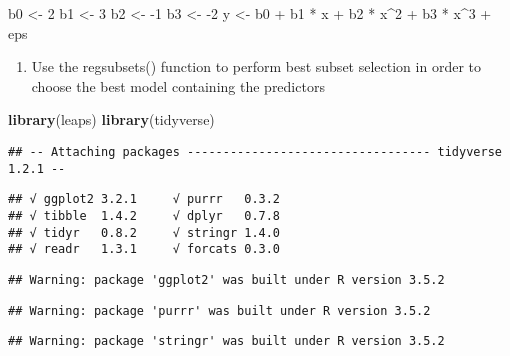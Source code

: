 \documentclass[]{article}
\newenvironment{Shaded}{\begin{snugshade}}{\end{snugshade}}
\newcommand{\KeywordTok}[1]{\textcolor[rgb]{0.13,0.29,0.53}{\textbf{{#1}}}}
\newcommand{\DecValTok}[1]{\textcolor[rgb]{0.00,0.00,0.81}{{#1}}}
\newcommand{\StringTok}[1]{\textcolor[rgb]{0.31,0.60,0.02}{{#1}}}
\newcommand{\NormalTok}[1]{{#1}}
\providecommand{\tightlist}{%
  \setlength{\itemsep}{0pt}\setlength{\parskip}{0pt}}
\begin{document}
\begin{Shaded}
\begin{Highlighting}[]
\NormalTok{b0 <-}\StringTok{ }\DecValTok{2}
\NormalTok{b1 <-}\StringTok{ }\DecValTok{3}
\NormalTok{b2 <-}\StringTok{ }\NormalTok{-}\DecValTok{1}
\NormalTok{b3 <-}\StringTok{ }\NormalTok{-}\DecValTok{2}
\NormalTok{y <-}\StringTok{ }\NormalTok{b0 +}\StringTok{ }\NormalTok{b1 *}\StringTok{ }\NormalTok{x +}\StringTok{ }\NormalTok{b2 *}\StringTok{ }\NormalTok{x^}\DecValTok{2} \NormalTok{+}\StringTok{ }\NormalTok{b3 *}\StringTok{ }\NormalTok{x^}\DecValTok{3} \NormalTok{+}\StringTok{ }\NormalTok{eps}
\end{Highlighting}
\end{Shaded}

\begin{enumerate}
\def\labelenumi{(\alph{enumi})}
\setcounter{enumi}{2}
\tightlist
\item
  Use the regsubsets() function to perform best subset selection in
  order to choose the best model containing the predictors
\end{enumerate}

\begin{Shaded}
\begin{Highlighting}[]
\KeywordTok{library}\NormalTok{(leaps)}
\KeywordTok{library}\NormalTok{(tidyverse)}
\end{Highlighting}
\end{Shaded}

\begin{verbatim}
## -- Attaching packages ---------------------------------- tidyverse 1.2.1 --
\end{verbatim}

\begin{verbatim}
## √ ggplot2 3.2.1     √ purrr   0.3.2
## √ tibble  1.4.2     √ dplyr   0.7.8
## √ tidyr   0.8.2     √ stringr 1.4.0
## √ readr   1.3.1     √ forcats 0.3.0
\end{verbatim}

\begin{verbatim}
## Warning: package 'ggplot2' was built under R version 3.5.2
\end{verbatim}

\begin{verbatim}
## Warning: package 'purrr' was built under R version 3.5.2
\end{verbatim}

\begin{verbatim}
## Warning: package 'stringr' was built under R version 3.5.2
\end{verbatim}
\end{document}
